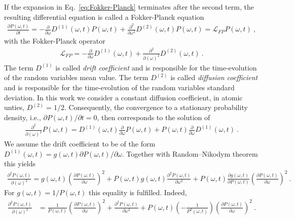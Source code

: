 \documentclass[11pt,a4paper]{article}
\numberwithin{equation}{section}
\begin{document}
If the expansion in Eq.~\eqref{eq:Fokker-Planck} terminates after the second term, the resulting differential equation is called a Fokker-Planck equation
\begin{align*}
\frac{\partial P(\omega,t)}{\partial t}
=
-\frac{\partial}{\partial \omega}D^{(1)}(\omega,t)P(\omega,t)
+
\frac{\partial^2}{\partial \omega^2}D^{(2)}(\omega,t)P(\omega,t)
=
\mathcal{L}_{FP} P(\omega,t)~,
\end{align*}
with the Fokker-Planck operator
\begin{align*}
\mathcal{L}_{FP}
=
-\frac{\partial}{\partial \omega}D^{(1)}(\omega,t)
+
\frac{\partial^2}{\partial (\omega)^2}D^{(2)}(\omega,t)~.
\end{align*}
The term $D^{(1)}$ is called {\it drift coefficient} and is responsible for the time-evolution of the random variables mean value. 
%
The term $D^{(2)}$ is called {\it diffusion coefficient} and is responsible for the time-evolution of the random variables standard deviation.
%
In this work we consider a constant diffusion coefficient, in atomic unties, $D^{(2)}=1/2$. 
%
Consequently, the convergence to a stationary probability density, i.e., ${\partial P(\omega,t)}/{\partial t}=0$, then corresponds to the solution of
\begin{align*}
\frac{\partial^2}{\partial (\omega)^2}P(\omega,t)
=
D^{(1)}(\omega,t)\frac{\partial}{\partial \omega}P(\omega,t)
+
P(\omega,t)\frac{\partial}{\partial \omega}D^{(1)}(\omega,t)~.
\end{align*}
We assume the drift coefficient to be of the form $D^{(1)}(\omega,t) = g(\omega,t)\partial P(\omega,t)/\partial \omega$. 
%
Together with Random--Nikodym theorem this yields
\begin{align*}
\frac{\partial^2P(\omega,t)}{\partial (\omega)^2}
=
g(\omega,t)\left(\frac{\partial P(\omega,t)}{\partial \omega}\right)^2
+
P(\omega,t)g(\omega,t) \frac{\partial^2 P(\omega,t)}{\partial \omega^2}
+
P(\omega,t)\frac{\partial g(\omega,t)}{\partial P(\omega,t)}\left(\frac{\partial P(\omega,t)}{\partial \omega}\right)^2~.
\end{align*}
For $g(\omega,t)=1/P(\omega,t)$ this equality is fulfilled.
%
Indeed,
\begin{align*}
\frac{\partial^2P(\omega,t)}{\partial (\omega)^2}
&=
\frac{1}{P(\omega,t)}\left(\frac{\partial P(\omega,t)}{\partial \omega}\right)^2
+
\frac{\partial^2 P(\omega,t)}{\partial \omega^2}
+
P(\omega,t)\left(-\frac{1}{P^2(\omega,t)}
\right)\left(\frac{\partial P(\omega,t)}{\partial \omega}\right)^2~.
\end{align*}
\end{document}
